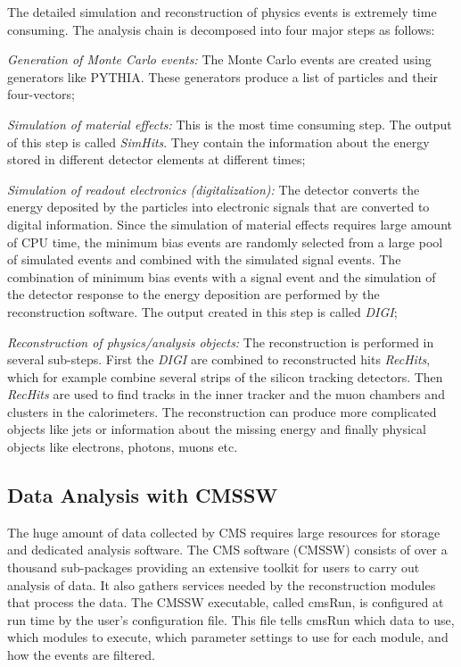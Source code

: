 The detailed simulation and reconstruction of physics events is extremely time consuming. The analysis chain is decomposed into four major steps as follows:
\begin{compact_enumerate}
\item {\it Generation of Monte Carlo events:}
The Monte Carlo events are created using generators like PYTHIA. These generators produce a list of particles and their four-vectors;
\item {\it Simulation of material effects:}
This is the most time consuming step. The output of this step is called \emph{SimHits}. They contain the information about the energy stored in different detector elements at different times;
\item {\it Simulation of readout electronics (digitalization):} 
The detector converts the energy deposited by the particles into electronic signals that are converted to digital information. Since the simulation of material effects requires large amount of CPU time, the minimum bias events are randomly selected from a large pool of simulated events and combined with the simulated signal events. The combination of minimum bias events with a signal event and the simulation of the detector response to the energy deposition are performed by the reconstruction software. The output created in this step is called \emph{DIGI};
\item {\it Reconstruction of physics/analysis objects: }
The reconstruction is performed in several sub-steps. First the \emph{DIGI} are combined to reconstructed hits \emph{RecHits}, which for example combine several strips of the silicon tracking detectors. Then \emph{RecHits} are used to find tracks in the inner tracker and the muon chambers and clusters in the calorimeters. The reconstruction can produce more complicated objects like jets or information about the missing energy and finally physical objects like electrons, photons, muons etc. 
\end{compact_enumerate}

\subsection{Data Analysis with CMSSW}
The huge amount of data collected by CMS requires large resources for storage and dedicated analysis software. The CMS software (CMSSW) consists of over a thousand sub-packages providing an extensive toolkit for users to carry out analysis of data. It also gathers services needed by the reconstruction modules that process the data. The CMSSW executable, called cmsRun, is configured at run time by the user's configuration file. This file tells cmsRun which data to use, which modules to execute, which parameter settings to use for each module, and how the events are filtered.  

